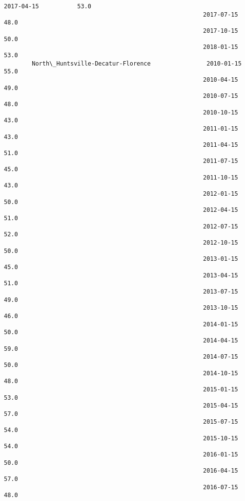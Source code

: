 \documentclass[11pt]{article}
\begin{document}
\begin{Verbatim}[commandchars=\\\{\}]
                                                         2017-04-15           53.0   
                                                         2017-07-15           48.0   
                                                         2017-10-15           50.0   
                                                         2018-01-15           53.0   
        North\_Huntsville-Decatur-Florence                2010-01-15           55.0   
                                                         2010-04-15           49.0   
                                                         2010-07-15           48.0   
                                                         2010-10-15           43.0   
                                                         2011-01-15           43.0   
                                                         2011-04-15           51.0   
                                                         2011-07-15           45.0   
                                                         2011-10-15           43.0   
                                                         2012-01-15           50.0   
                                                         2012-04-15           51.0   
                                                         2012-07-15           52.0   
                                                         2012-10-15           50.0   
                                                         2013-01-15           45.0   
                                                         2013-04-15           51.0   
                                                         2013-07-15           49.0   
                                                         2013-10-15           46.0   
                                                         2014-01-15           50.0   
                                                         2014-04-15           59.0   
                                                         2014-07-15           50.0   
                                                         2014-10-15           48.0   
                                                         2015-01-15           53.0   
                                                         2015-04-15           57.0   
                                                         2015-07-15           54.0   
                                                         2015-10-15           54.0   
                                                         2016-01-15           50.0   
                                                         2016-04-15           57.0   
                                                         2016-07-15           48.0   

\end{Verbatim}
\end{document}
